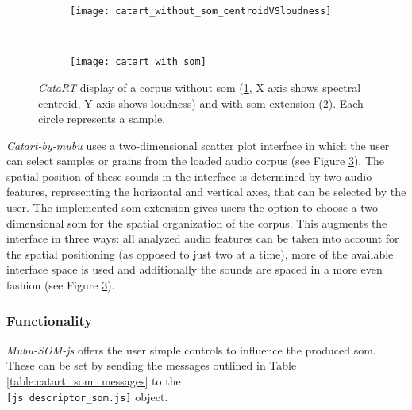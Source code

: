 \begin{figure}[!htb]
  \centering
\begin{subfigure}{0.45\textwidth}
  \centering
  \texttt{[image: catart\_without\_som\_centroidVSloudness]}
  \caption{}
  \label{fig:catart_no_som}
\end{subfigure}
~
\begin{subfigure}{0.45\textwidth}
  \centering
  \texttt{[image: catart\_with\_som]}
  \caption{}
  \label{fig:catart_with_som}
\end{subfigure}
\caption[\textit{CataRT}: with and without \gls{som}]{\textit{CataRT} display of
a corpus without \gls{som}
(\ref{fig:catart_no_som}, X axis shows spectral centroid, Y axis shows loudness)
and with \gls{som} extension (\ref{fig:catart_with_som}). Each circle represents
a sample.}
\label{fig:catart_som_vs_no_som}
\end{figure}


\textit{Catart-by-mubu} uses a
two-dimensional scatter plot interface in which the user can select samples or
grains from the loaded audio corpus (see Figure \ref{fig:catart_som_vs_no_som}).
The spatial position of these sounds in the interface is determined by two audio
features, representing the horizontal and vertical axes, that can be selected by
the user.
The implemented \gls{som} extension gives users the option to choose a
two-dimensional \gls{som} for the spatial organization of the corpus. This
augments the interface in three ways: all analyzed audio features can be
taken into account for the spatial positioning (as opposed to just two at a
time), more of the available interface space is used and additionally the sounds
are spaced in a more even fashion (see Figure \ref{fig:catart_som_vs_no_som}).

\subsubsection{Functionality}
\label{subsubec:mubu-som_functionality}
\textit{Mubu-SOM-js} offers the user simple controls to influence the produced
\gls{som}. These can be set by sending the messages outlined in Table
\ref{table:catart_som_messages} to the \\ \texttt{[js descriptor\_som.js]}
object.

